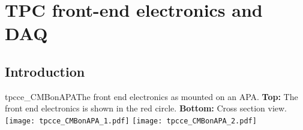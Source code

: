





\section{TPC front-end electronics and DAQ}
\label{ch:ce}

%
\subsection{Introduction}
\label{subsec:ce_intro}

\begin{cdrfigure}{tpcce_CMBonAPA}{The front end electronics as mounted on an APA.
  {\bf Top:} The front end electronics  is shown in the red circle.
  {\bf Bottom:} Cross section view.}
\texttt{[image: tpcce\_CMBonAPA\_1.pdf]}
\texttt{[image: tpcce\_CMBonAPA\_2.pdf]}
\end{cdrfigure}

